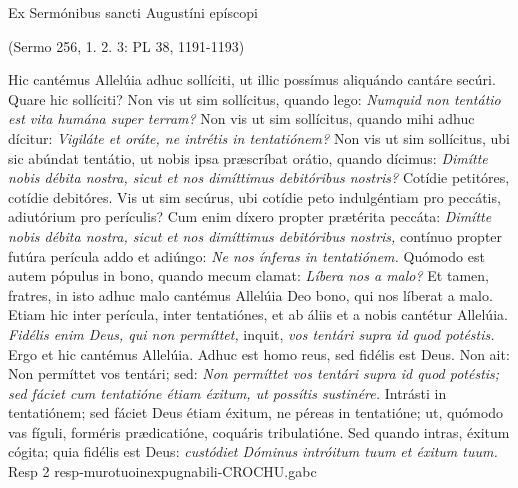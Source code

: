 \documentclass[options]{article}
\begin{document}
	Ex Sermónibus sancti Augustíni epíscopi
	\begin{flushright}
		(Sermo 256, 1. 2. 3: PL 38, 1191-1193)
	\end{flushright}
	Hic cantémus Allelúia adhuc sollíciti, ut illic possímus aliquándo cantáre secúri. Quare hic sollíciti? Non vis ut sim sollícitus, quando lego: \emph{Numquid non tentátio est vita humána super terram?} Non vis ut sim sollícitus, quando mihi adhuc dícitur: \emph{Vigiláte et oráte, ne intrétis in tentatiónem?} Non vis ut sim sollícitus, ubi sic abúndat tentátio, ut nobis ipsa præscríbat orátio, quando dícimus: \emph{Dimítte nobis débita nostra, sicut et nos dimíttimus debitóribus nostris?} Cotídie petitóres, cotídie debitóres. Vis ut sim secúrus, ubi cotídie peto indulgéntiam pro peccátis, adiutórium pro perículis? Cum enim díxero propter prætérita peccáta: \emph{Dimítte nobis débita nostra, sicut et nos dimíttimus debitóribus nostris,} contínuo propter futúra perícula addo et adiúngo: \emph{Ne nos ínferas in tentatiónem.} Quómodo est autem pópulus in bono, quando mecum clamat: \emph{Líbera nos a malo?} Et tamen, fratres, in isto adhuc malo cantémus Allelúia Deo bono, qui nos líberat a malo.\\
	Etiam hic inter perícula, inter tentatiónes, et ab áliis et a nobis cantétur Allelúia. \emph{Fidélis enim Deus, qui non permíttet,} inquit, \emph{vos tentári supra id quod potéstis.} Ergo et hic cantémus Allelúia. Adhuc est homo reus, sed fidélis est Deus. Non ait: Non permíttet vos tentári; sed: \emph{Non permíttet vos tentári supra id quod potéstis; sed fáciet cum tentatióne étiam éxitum, ut possítis sustinére.} Intrásti in tentatiónem; sed fáciet Deus étiam éxitum, ne péreas in tentatióne; ut, quómodo vas fíguli, forméris prædicatióne, coquáris tribulatióne. Sed quando intras, éxitum cógita; quia fidélis est Deus: \emph{custódiet Dóminus intróitum tuum et éxitum tuum.}\\
	
Resp 2	resp-murotuoinexpugnabili-CROCHU.gabc\\
	\\
	
\end{document}
